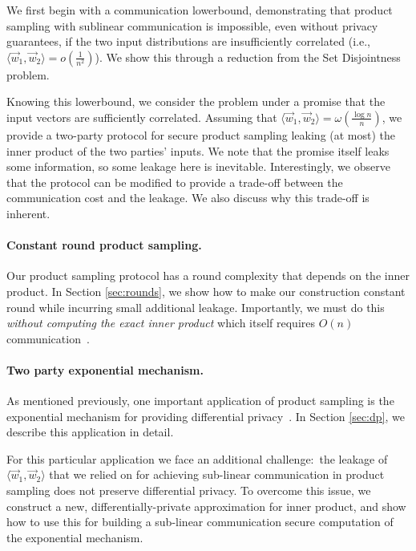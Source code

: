 We first begin with a communication lowerbound, demonstrating that
product sampling with sublinear communication is impossible, even
without privacy guarantees, if the two input distributions are
insufficiently correlated (i.e., $\langle \vec{w}_1, \vec{w}_2\rangle =
o(\frac{1}{n^2})$). We show this through a reduction from
the Set Disjointness problem. 
 
Knowing this lowerbound, we consider the problem under a promise that the input
vectors are sufficiently correlated. Assuming that $\langle \vec{w}_1,
\vec{w}_2\rangle = \omega(\frac{\log n}{n})$, we provide a two-party
protocol for secure product sampling leaking (at most) the inner product
of the two parties' inputs. We note that the promise itself leaks some
information, so some leakage here is inevitable.  
Interestingly, we observe that the protocol can be modified to provide a
trade-off between the communication cost and the leakage. We also
discuss why this trade-off is inherent. 
%

\paragraph{Constant round product sampling.} Our product sampling
protocol has a round complexity that depends on the inner product. In
Section \ref{sec:rounds}, we show how to make our construction
constant round while incurring small additional leakage.  Importantly,
we must do this {\em without computing the exact inner product} which itself
 requires $O(n)$ communication~\cite{STOC:BabNisSze89}.

\paragraph{Two party exponential mechanism.}  As mentioned previously,
one important application of product sampling is the exponential
mechanism for providing differential privacy~\cite{FOCS:McSTal07}.  In Section  \ref{sec:dp},
we describe this application in detail.  

For this particular application we face an additional challenge:~the
leakage of $\langle \vec{w}_1, \vec{w}_2\rangle$ that we relied on for
achieving sub-linear communication in product sampling does not preserve
differential privacy.  To overcome this issue, we construct a new,
differentially-private approximation for inner product, and show how to
use this for building a sub-linear communication secure computation of
the exponential mechanism.  

